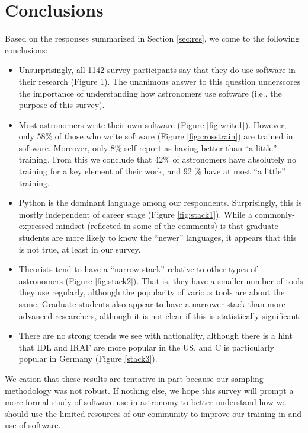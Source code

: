 
\section{Conclusions}
\label{sec:conc}


Based on the responses summarized in Section \ref{sec:res}, we come to the following conclusions:



\begin{itemize}
\item Unsurprisingly, all 1142 survey participants say that they do use software in their research (Figure 1). The unanimous answer to this question underscores the importance of understanding how astronomers use software (i.e., the purpose of this survey).
\item Most astronomers write their own software (Figure \ref{fig:write1}).  However, only 58\% of those who write software (Figure \ref{fig:crosstrain}) are trained in software.  Moreover, only 8\% self-report as having better than ``a little'' training.  From this we conclude that 42\% of astronomers have absolutely no training for a key element of their work, and 92 \% have at most ``a little'' training.  
\item Python is the dominant language among our respondents.  Surprisingly, this is mostly independent of career stage (Figure \ref{fig:stack1}).  While a commonly-expressed mindset (reflected in some of the comments) is that graduate students are more likely to know the ``newer'' languages, it appears that this is not true, at least in our survey.
\item Theorists tend to have a ``narrow stack'' relative to other types of astronomers (Figure \ref{fig:stack2}).  That is, they have a smaller number of tools they use regularly, although the popularity of various tools are about the same.  Graduate students also appear to have a narrower stack than more advanced researchers, although it is not clear if this is statistically significant. 
\item There are no strong trends we see with nationality, although there is a hint that IDL and IRAF are more popular in the US, and C is particularly popular in Germany (Figure \ref{stack3}).
\end{itemize}

We cation that these results are tentative in part because our sampling methodology was not robust.  If nothing else, we hope this survey will prompt a more formal study of software use in astronomy to better understand how we should use the limited resources of our community to improve our training in and use of software.

